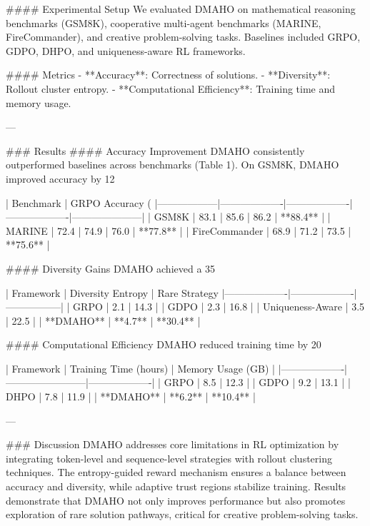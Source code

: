 #### Experimental Setup
We evaluated DMAHO on mathematical reasoning benchmarks (GSM8K), cooperative multi-agent benchmarks (MARINE, FireCommander), and creative problem-solving tasks. Baselines included GRPO, GDPO, DHPO, and uniqueness-aware RL frameworks.

#### Metrics
- **Accuracy**: Correctness of solutions.
- **Diversity**: Rollout cluster entropy.
- **Computational Efficiency**: Training time and memory usage.

---

### Results
#### Accuracy Improvement
DMAHO consistently outperformed baselines across benchmarks (Table 1). On GSM8K, DMAHO improved accuracy by 12%

| Benchmark        | GRPO Accuracy (%
|------------------|-------------------|-------------------|-------------------|---------------------|
| GSM8K            | 83.1             | 85.6             | 86.2             | **88.4**           |
| MARINE           | 72.4             | 74.9             | 76.0             | **77.8**           |
| FireCommander    | 68.9             | 71.2             | 73.5             | **75.6**           |

#### Diversity Gains
DMAHO achieved a 35%

| Framework         | Diversity Entropy | Rare Strategy %
|-------------------|-------------------|-----------------|
| GRPO             | 2.1               | 14.3            |
| GDPO             | 2.3               | 16.8            |
| Uniqueness-Aware | 3.5               | 22.5            |
| **DMAHO**        | **4.7**           | **30.4**        |

#### Computational Efficiency
DMAHO reduced training time by 20%

| Framework         | Training Time (hours) | Memory Usage (GB) |
|-------------------|------------------------|-------------------|
| GRPO             | 8.5                    | 12.3              |
| GDPO             | 9.2                    | 13.1              |
| DHPO             | 7.8                    | 11.9              |
| **DMAHO**        | **6.2**                | **10.4**          |

---

### Discussion
DMAHO addresses core limitations in RL optimization by integrating token-level and sequence-level strategies with rollout clustering techniques. The entropy-guided reward mechanism ensures a balance between accuracy and diversity, while adaptive trust regions stabilize training. Results demonstrate that DMAHO not only improves performance but also promotes exploration of rare solution pathways, critical for creative problem-solving tasks.

